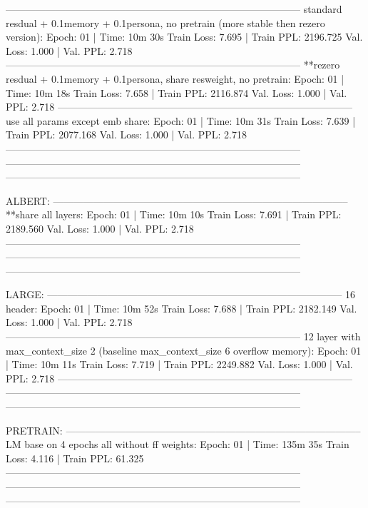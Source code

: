 \documentclass[letterpaper]{article} %
\begin{document}
\begin{CJK*}{UTF8}{gbsn}
-----------------------------------------------------------------------------------------
standard resdual + 0.1memory + 0.1persona, no pretrain (more stable then rezero version):
Epoch: 01 | Time: 10m 30s
	Train Loss: 7.695 | Train PPL: 2196.725
	 Val. Loss: 1.000 |  Val. PPL:   2.718
-----------------------------------------------------------------------------------------
**rezero resdual + 0.1memory + 0.1persona, share resweight, no pretrain:
Epoch: 01 | Time: 10m 18s
	Train Loss: 7.658 | Train PPL: 2116.874
	 Val. Loss: 1.000 |  Val. PPL:   2.718
-----------------------------------------------------------------------------------------
use all params except emb share:
Epoch: 01 | Time: 10m 31s
	Train Loss: 7.639 | Train PPL: 2077.168
	 Val. Loss: 1.000 |  Val. PPL:   2.718
-----------------------------------------------------------------------------------------
-----------------------------------------------------------------------------------------
-----------------------------------------------------------------------------------------

ALBERT:
-----------------------------------------------------------------------------------------
**share all layers:
Epoch: 01 | Time: 10m 10s
	Train Loss: 7.691 | Train PPL: 2189.560
	 Val. Loss: 1.000 |  Val. PPL:   2.718
-----------------------------------------------------------------------------------------
-----------------------------------------------------------------------------------------
-----------------------------------------------------------------------------------------

LARGE:
-----------------------------------------------------------------------------------------
16 header:
Epoch: 01 | Time: 10m 52s
	Train Loss: 7.688 | Train PPL: 2182.149
	 Val. Loss: 1.000 |  Val. PPL:   2.718
-----------------------------------------------------------------------------------------
12 layer with max_context_size 2 (baseline max_context_size 6 overflow memory):
Epoch: 01 | Time: 10m 11s
	Train Loss: 7.719 | Train PPL: 2249.882
	 Val. Loss: 1.000 |  Val. PPL:   2.718
-----------------------------------------------------------------------------------------
-----------------------------------------------------------------------------------------
-----------------------------------------------------------------------------------------

PRETRAIN:
-----------------------------------------------------------------------------------------
LM base on 4 epochs all without ff weights:
Epoch: 01 | Time: 135m 35s
	Train Loss: 4.116 | Train PPL:  61.325
-----------------------------------------------------------------------------------------
-----------------------------------------------------------------------------------------
-----------------------------------------------------------------------------------------



\end{CJK*}
\end{document}

